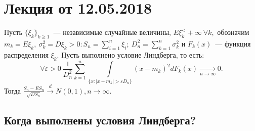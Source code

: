 
	\section{Лекция от 12.05.2018}
	\begin{theorem}[Линдберга][б/д]
		Пусть \(\{\xi_k\}_{k \geqslant 1}\)~--- независимые случайные величины, \(E\xi_k^ < +\infty ~ \forall k,\) обозначим \(m_k = E\xi_k, ~\sigma^2_k = D\xi_k > 0: S_n = \sum\limits_{i = 1}^{n}\xi_i; ~ D_n^2 = \sum\limits_{k = 1}^{n}\sigma^2_k\) и \(F_k(x)\)~--- функция распределения \(\xi_k\). Пусть выполнено условие Линдберга, то есть:
		\[
			\forall \varepsilon > 0 ~ \frac{1}{D^2_n} \sum\limits_{k = 1}^{n} \int\limits_{\{x:|x - m_k| > \varepsilon D_n\}}(x-m_k)^2 dF_k(x) \underset{n \to \infty}{\longrightarrow} 0.
		\]
		Тогда \( \frac{S_n - ES_n}{\sqrt{DS_n}} \overset{d}{\longrightarrow} N(0,1), n\to \infty\).
	\end{theorem}

	\subsection{Когда выполнены условия Линдберга?}

